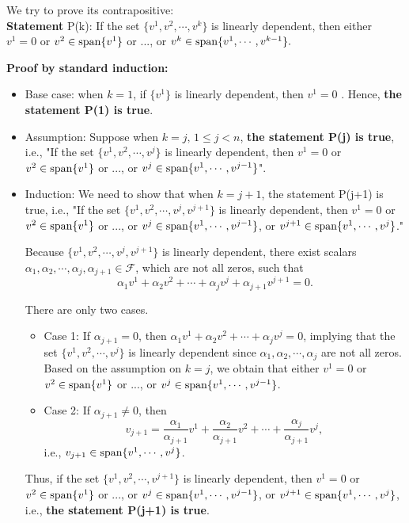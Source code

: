 \documentclass[letterpaper]{article}
\begin{document}
\begin{enumerate}
 We try to prove its contrapositive:\\[2mm]
 \textbf{Statement} P(k): If the set $\{v^1, v^2, \cdots, v^k\}$ is linearly dependent, then either $v^1 = 0$ or $v^2 \in \textrm{span} \{ v^1 \}$ or $...$, or $v^k \in \textrm{span} \{ v^1, \cdots, v^{k-1} \}.$

\textbf{Proof by standard induction:}
\begin{itemize}
  \item Base case: when $k=1$, if $\{v^{1}\}$ is linearly dependent, then $v^{1}=0$ . Hence, \textbf{the statement P(1) is true}.
  \\[2mm]
  \item Assumption: Suppose when $k=j,\, 1\le j< n$, \textbf{the statement P(j) is true}, i.e., "If the set $\{v^1, v^2, \cdots, v^j\}$ is linearly dependent, then $v^1 = 0$ or $v^2 \in \textrm{span} \{ v^1 \}$ or $...$, or $v^j \in \textrm{span} \{ v^1, \cdots, v^{j-1} \}$".\\[2mm]

  \item Induction: We need to show that when $k=j+1$, the statement P(j+1) is true, i.e., "If the set $\{v^1, v^2, \cdots, v^j, v^{j+1}\}$ is linearly dependent, then $v^1 = 0$ or $v^2 \in \textrm{span} \{ v^1 \}$ or $...$, or $v^j \in \textrm{span} \{ v^1, \cdots, v^{j-1} \}$, or $v^{j+1} \in \textrm{span} \{ v^1, \cdots, v^{j} \}$."

      Because $\{v^1, v^2, \cdots, v^{j}, v^{j+1}\}$ is linearly dependent, there exist scalars $\alpha_1, \alpha_2, \cdots, \alpha_{j}, \alpha_{j+1}\in \mathcal{F}$, which are not all zeros, such that
      \begin{equation*}
        \alpha_1 v^{1}+ \alpha_2 v^{2}+ \cdots+\alpha_{j} v^{j}+\alpha_{j+1}v^{j+1}=0.
      \end{equation*}

      There are only two cases.
      \begin{itemize}
        \item[] Case 1: If $\alpha_{j+1}=0$, then $\alpha_1 v^{1}+ \alpha_2 v^{2}+ \cdots+\alpha_{j} v^{j}=0$, implying that the set  $\{v^1, v^2, \cdots, v^j\}$ is linearly dependent since $\alpha_1, \alpha_2, \cdots, \alpha_{j}$ are not all zeros. Based on the assumption on $k=j$, we obtain that either $v^1 = 0$ or $v^2 \in \textrm{span} \{ v^1 \}$ or $...$, or $v^j \in \textrm{span} \{ v^1, \cdots, v^{j-1} \}$.

        \item[] Case 2: If $\alpha_{j+1}\ne 0$, then
            \begin{equation*}
              v_{j+1}=\dfrac{\alpha_1}{\alpha_{j+1}} v^{1}+ \dfrac{\alpha_2}{\alpha_{j+1}} v^{2}+ \cdots+\dfrac{\alpha_j}{\alpha_{j+1}} v^{j},
            \end{equation*}
            i.e., $v_{j+1}\in \textrm{span} \{ v^1, \cdots, v^{j} \}$.
      \end{itemize}
      Thus, if the set $\{v^1, v^2, \cdots, v^{j+1}\}$ is linearly dependent, then $v^1 = 0$ or $v^2 \in \textrm{span} \{ v^1 \}$ or $...$, or $v^j \in \textrm{span} \{ v^1, \cdots, v^{j-1} \}$, or $v^{j+1} \in \textrm{span} \{ v^1, \cdots, v^{j} \}$, i.e., \textbf{the statement P(j+1) is true}.\\[2mm]


\end{itemize}
\end{enumerate}
\end{document}

